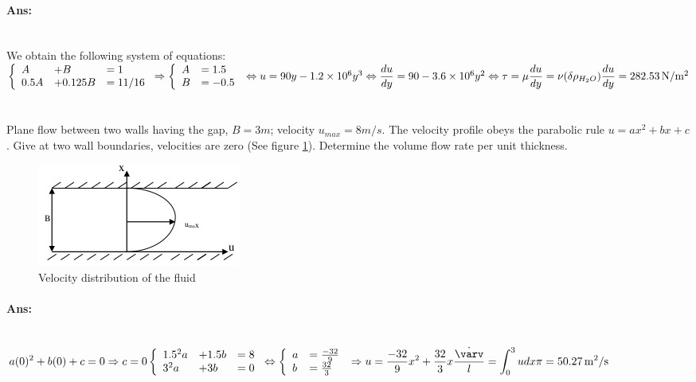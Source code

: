 \paragraph{Ans:}$ $\\
We obtain the following system of equations:\\
$ \left\{\begin{array}{lll}
A&+B&=1\\
0.5A&+0.125B&=11/16
\end{array}\right. \Rightarrow 
\left\{\begin{array}{ll}
A&=1.5\\
B&=-0.5
\end{array}\right.\\
\Leftrightarrow u = 90y -1.2\times10^6y^3\\
\Leftrightarrow \dfrac{du}{dy} = 90 - 3.6\times10^6y^2\\
\Leftrightarrow \tau = \mu\dfrac{du}{dy} = \nu(\delta\rho_{H_2O})\dfrac{du}{dy} = 282.53\, \mathrm{N/m^2}$
\section{}
Plane flow between two walls having the gap, $ B = 3\unit{m} $; velocity $ u_{max} = 8 \unit{m/s} $. The velocity profile obeys the parabolic rule $ u = ax^2 + bx + c $. Give at two wall boundaries, velocities are zero (See figure \ref{fig:2020-09-02_23-00-33}). Determine the volume flow rate per unit thickness.
\begin{figure}[h]
	\centering
	\includegraphics[width=0.4\linewidth]{"Screenshot_2020-09-02_23-00-33"}
	\caption{Velocity distribution of the fluid}
	\label{fig:2020-09-02_23-00-33}
\end{figure}
\paragraph{Ans:}$ $\\
$ \displaystyle a(0)^2+b(0)+c=0\Rightarrow c=  0\\
\left\{\begin{array}{lll}
1.5^2a&+1.5b&=8\\
3^2a&+3b&=0
\end{array}\right.
\Leftrightarrow
\left\{\begin{array}{ll}
a&=\frac{-32}{9}\\
b&=\frac{32}{3}
\end{array}\right.\\
\Rightarrow u = \dfrac{-32}{9}x^2 + \dfrac{32}{3}x\\
\dfrac{\dot{\varv}}{l} = \int_{0}^{3}udx \pi = 50.27\unit{m^2/s}$
